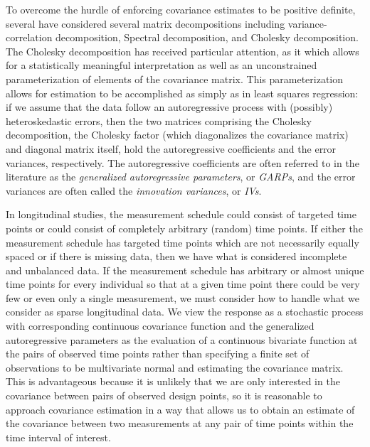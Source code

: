 
To overcome the hurdle of enforcing covariance estimates to be positive definite, several have considered several matrix decompositions including variance-correlation decomposition, Spectral decomposition, and Cholesky decomposition. The Cholesky decomposition has received particular attention, as it which allows for a statistically meaningful interpretation as well as an unconstrained parameterization of elements of the covariance matrix. This parameterization allows for estimation to be accomplished as simply as in least squares regression: if we assume that the data follow an autoregressive process with (possibly) heteroskedastic errors, then the two matrices comprising the Cholesky decomposition, the Cholesky factor (which diagonalizes the covariance matrix) and diagonal matrix itself, hold the autoregressive coefficients and the error variances, respectively. The autoregressive coefficients are often referred to in the literature as the \emph{generalized autoregressive parameters}, or \emph{GARPs}, and the error variances are often called the \emph{innovation variances}, or \emph{IVs}.

In longitudinal studies, the measurement schedule could consist of targeted time points or could consist of completely arbitrary (random) time points. If either the measurement schedule has targeted time points which are not necessarily equally spaced or if there is missing data, then we have what is considered incomplete and unbalanced data. If the measurement schedule has arbitrary or almost unique time points for every individual so that at a given time point there could be very few or even only a single measurement, we must consider how to handle what we consider as sparse longitudinal data. We view the response as a stochastic process with corresponding continuous covariance function and the generalized autoregressive parameters as the evaluation of a continuous bivariate function at the pairs of observed time points rather than specifying a finite set of observations to be multivariate normal and estimating the covariance matrix. This is advantageous because it is unlikely that we are only interested in the covariance between pairs of observed design points, so it is reasonable to approach covariance estimation in a way that allows us to obtain an estimate of the covariance between two measurements at any pair of time points within the time interval of interest. 

